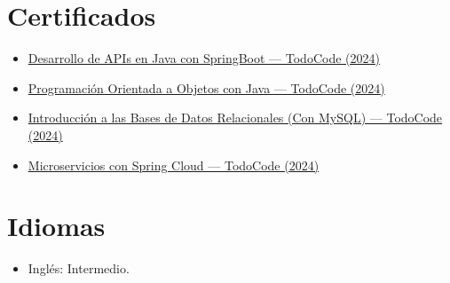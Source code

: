\documentclass[a4paper,10pt]{article}
\begin{document}
\section*{Certificados}
\begin{itemize}
    \item \href{https://todocodeacademy.com/certificate/gav/}{Desarrollo de APIs en Java con SpringBoot — TodoCode (2024)}
    \item \href{https://todocodeacademy.com/certificate/siq/}{Programación Orientada a Objetos con Java — TodoCode (2024)}
    \item \href{https://todocodeacademy.com/certificate/uzh/}{Introducción a las Bases de Datos Relacionales (Con MySQL) — TodoCode (2024)}
    \item \href{https://todocodeacademy.com/certificate/lam/}{Microservicios con Spring Cloud — TodoCode (2024)}
\end{itemize}

\vspace{0.5cm}

\section*{Idiomas}
\begin{itemize}
    \item Inglés: Intermedio.
\end{itemize}

\vspace{0.5cm}
\end{document}
